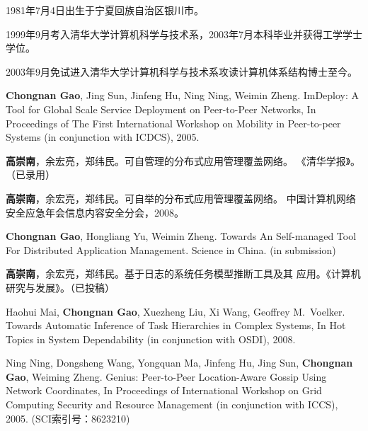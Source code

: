 \begin{resume}


  1981年7月4日出生于宁夏回族自治区银川市。

  1999年9月考入清华大学计算机科学与技术系，2003年7月本科毕业并获得工学学士学位。

  2003年9月免试进入清华大学计算机科学与技术系攻读计算机体系结构博士至今。


  \begin{enumerate}[{[}1{]}]

  \item \textbf{Chongnan Gao}, Jing Sun, Jinfeng Hu, Ning Ning, Weimin
  Zheng.  ImDeploy: A Tool for Global Scale Service Deployment on
  Peer-to-Peer Networks, In Proceedings of The First International Workshop
  on Mobility in Peer-to-peer Systems (in conjunction with ICDCS), 2005.

  \item \textbf{高崇南}，余宏亮，郑纬民。可自管理的分布式应用管理覆盖网络。
  《清华学报》。（已录用）

  \item \textbf{高崇南}，余宏亮，郑纬民。可自举的分布式应用管理覆盖网络。
  中国计算机网络安全应急年会信息内容安全分会，2008。

  \item \textbf{Chongnan Gao}, Hongliang Yu, Weimin Zheng. Towards An
  Self-managed Tool For Distributed Application Management. Science in
  China. (in submission)

  \item \textbf{高崇南}，余宏亮，郑纬民。基于日志的系统任务模型推断工具及其
  应用。《计算机研究与发展》。（已投稿）

  \item Haohui Mai, \textbf{Chongnan Gao}, Xuezheng Liu, Xi Wang, Geoffrey
  M.\ Voelker. Towards Automatic Inference of Task Hierarchies in Complex
  Systems, In Hot Topics in System Dependability (in conjunction with OSDI),
  2008.

  \item Ning Ning, Dongsheng Wang, Yongquan Ma, Jinfeng Hu, Jing Sun,
  \textbf{Chongnan Gao}, Weiming Zheng. Genius: Peer-to-Peer Location-Aware
  Gossip Using Network Coordinates, In Proceedings of International Workshop
  on Grid Computing Security and Resource Management (in conjunction with
  ICCS), 2005. (SCI索引号：8623210)


\end{enumerate}
\end{resume}
